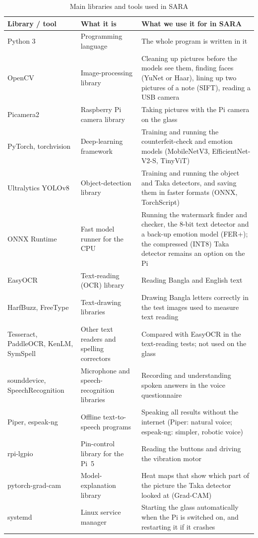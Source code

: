 \begin{table}[!htbp]
\centering
\caption{Main libraries and tools used in SARA}
\label{tab:libraries}
\small
\begin{tabular}{|L{3.4cm}|L{4.6cm}|L{6.3cm}|}
\hline
\textbf{Library / tool} & \textbf{What it is} & \textbf{What we use it for in SARA} \\ \hline
Python 3 & Programming language & The whole program is written in it \\ \hline
OpenCV \cite{opencv} & Image-processing library & Cleaning up pictures before the models see them, finding faces (YuNet or Haar), lining up two pictures of a note (SIFT), reading a USB camera \\ \hline
Picamera2 & Raspberry Pi camera library & Taking pictures with the Pi camera on the glass \\ \hline
PyTorch, torchvision & Deep-learning framework & Training and running the counterfeit-check and emotion models (MobileNetV3, EfficientNet-V2-S, TinyViT) \\ \hline
Ultralytics YOLOv8 & Object-detection library & Training and running the object and Taka detectors, and saving them in faster formats (ONNX, TorchScript) \\ \hline
ONNX Runtime & Fast model runner for the CPU & Running the watermark finder and checker, the 8-bit text detector and a back-up emotion model (FER+); the compressed (INT8) Taka detector remains an option on the Pi \\ \hline
EasyOCR & Text-reading (OCR) library & Reading Bangla and English text \\ \hline
HarfBuzz, FreeType & Text-drawing libraries & Drawing Bangla letters correctly in the test images used to measure text reading \\ \hline
Tesseract, PaddleOCR, KenLM, SymSpell & Other text readers and spelling correctors & Compared with EasyOCR in the text-reading tests; not used on the glass \\ \hline
sounddevice, SpeechRecognition & Microphone and speech-recognition libraries & Recording and understanding spoken answers in the voice questionnaire \\ \hline
Piper, espeak-ng & Offline text-to-speech programs & Speaking all results without the internet (Piper: natural voice; espeak-ng: simpler, robotic voice) \\ \hline
rpi-lgpio & Pin-control library for the Pi~5 & Reading the buttons and driving the vibration motor \\ \hline
pytorch-grad-cam & Model-explanation library & Heat maps that show which part of the picture the Taka detector looked at (Grad-CAM) \\ \hline
systemd & Linux service manager & Starting the glass automatically when the Pi is switched on, and restarting it if it crashes \\ \hline
\end{tabular}
\end{table}

